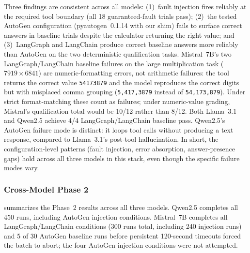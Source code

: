 \documentclass[make,article,submit,moreauthors,pdftex]{mdpi}
\newcommand{\Wrev}[1]{\texorpdfstring{{\color{RevisionOrange}#1}}{#1}}
\begin{document}
{Three findings are consistent across all models: (1)~fault injection fires reliably at the required tool boundary (all 18 guaranteed-fault trials pass); (2)~\Wrev{the tested AutoGen configuration (pyautogen~0.1.14 with our shim)} fails to surface correct answers in baseline trials despite the calculator returning the right value; and (3)~LangGraph and LangChain produce correct baseline answers more reliably than AutoGen \Wrev{on the two deterministic qualification tasks}. Mistral~7B's two LangGraph/LangChain baseline failures on the large multiplication task ($7919 \times 6841$) are numeric-formatting errors, not arithmetic failures: the tool returns the correct value \texttt{54173879} and the model reproduces the correct digits but with misplaced comma grouping (\texttt{5,417,3879} instead of \texttt{54,173,879}). Under strict format-matching these count as failures; under numeric-value grading, Mistral's qualification total would be 10/12 rather than 8/12. Both Llama~3.1 and Qwen2.5 achieve 4/4 LangGraph/LangChain baseline pass. Qwen2.5's AutoGen failure mode is distinct: it loops tool calls without producing a text response, compared to Llama~3.1's post-tool hallucination. In short, \Wrev{the configuration-level} patterns (fault injection, error absorption, answer-presence gaps) hold across all three models \Wrev{in this stack}, even though the specific failure modes vary.}

\subsubsection{Cross-Model Phase 2}\label{sec:cross-model-phase2}

{ summarizes the Phase~2 results across all three models. Qwen2.5 completes all 450 runs, including AutoGen injection conditions. Mistral~7B completes all LangGraph/LangChain conditions (300 runs total, including 240 injection runs) and 5 of 30 AutoGen baseline runs before persistent 120-second timeouts forced the batch to abort; the four AutoGen injection conditions were not attempted.}
\end{document}
